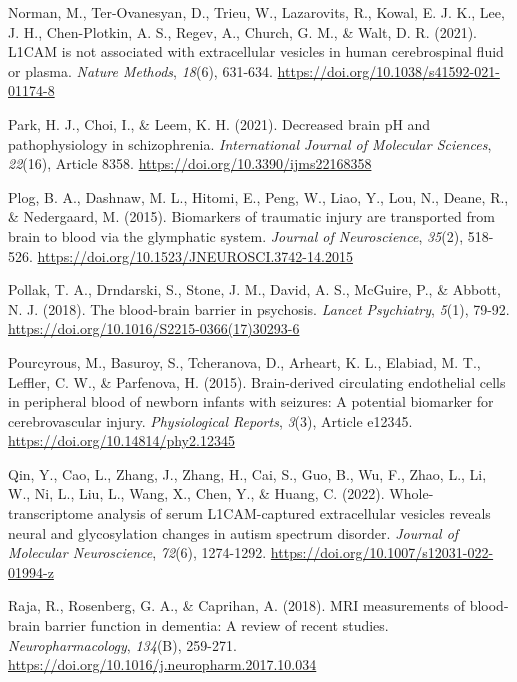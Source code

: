 \documentclass[authordate, empirical, issue]{jote-new-article}
\begin{document}
	Norman, M., Ter-Ovanesyan, D., Trieu, W., Lazarovits, R., Kowal, E. J. K., Lee, J. H., Chen-Plotkin, A. S., Regev, A., Church, G. M., \& Walt, D. R. (2021). L1CAM is not associated with extracellular vesicles in human cerebrospinal fluid or plasma. \emph{Nature Methods},\emph{ 18}(6), 631-634. \url{https://doi.org/10.1038/s41592-021-01174-8}



	Park, H. J., Choi, I., \& Leem, K. H. (2021). Decreased brain pH and pathophysiology in schizophrenia. \emph{International Journal of Molecular Sciences},\emph{ 22}(16), Article 8358. \url{https://doi.org/10.3390/ijms22168358}



	Plog, B. A., Dashnaw, M. L., Hitomi, E., Peng, W., Liao, Y., Lou, N., Deane, R., \& Nedergaard, M. (2015). Biomarkers of traumatic injury are transported from brain to blood via the glymphatic system. \emph{Journal of Neuroscience},\emph{ 35}(2), 518-526. \url{https://doi.org/10.1523/JNEUROSCI.3742-14.2015}



	Pollak, T. A., Drndarski, S., Stone, J. M., David, A. S., McGuire, P., \& Abbott, N. J. (2018). The blood-brain barrier in psychosis. \emph{Lancet Psychiatry},\emph{ 5}(1), 79-92. \url{https://doi.org/10.1016/S2215-0366(17)30293-6}



	Pourcyrous, M., Basuroy, S., Tcheranova, D., Arheart, K. L., Elabiad, M. T., Leffler, C. W., \& Parfenova, H. (2015). Brain-derived circulating endothelial cells in peripheral blood of newborn infants with seizures: A potential biomarker for cerebrovascular injury. \emph{Physiological Reports},\emph{ 3}(3), Article e12345. \url{https://doi.org/10.14814/phy2.12345}



	Qin, Y., Cao, L., Zhang, J., Zhang, H., Cai, S., Guo, B., Wu, F., Zhao, L., Li, W., Ni, L., Liu, L., Wang, X., Chen, Y., \& Huang, C. (2022). Whole-transcriptome analysis of serum L1CAM-captured extracellular vesicles reveals neural and glycosylation changes in autism spectrum disorder. \emph{Journal of Molecular Neuroscience},\emph{ 72}(6), 1274-1292. \url{https://doi.org/10.1007/s12031-022-01994-z}



	Raja, R., Rosenberg, G. A., \& Caprihan, A. (2018). MRI measurements of blood-brain barrier function in dementia: A review of recent studies. \emph{Neuropharmacology}, \emph{134}(B), 259-271. \url{https://doi.org/10.1016/j.neuropharm.2017.10.034}
\end{document}
